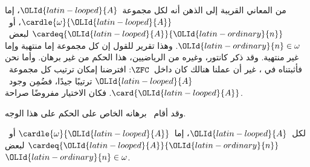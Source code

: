 \documentclass[../../../include/open-logic-section]{subfiles}
\begin{document}
\begin{ex}
من المعاني القريبة إلى الذهن أنه لكل مجموعة~$\OLId{latin-looped}{A}$، إما
$\cardle{\omega}{\OLId{latin-looped}{A}}$، أو~$\cardeq{\OLId{latin-looped}{A}}{\OLId{latin-ordinary}{n}}$ لبعض~$\OLId{latin-ordinary}{n} \in \omega$. وهذا
تقرير للقول إن كل مجموعة إما منتهية وإما غير منتهية. وقد ذكر كانتور،
وغيره من الرياضيين، هذا الحكم من غير برهان. وأما نحن فأثبتناه في
، غير أن عملنا
هنالك كان داخل~$\ZFC$: افترضنا إمكان ترتيب كل مجموعة~$\OLId{latin-looped}{A}$ ترتيبًا
جيدًا، فضُمِن وجود~$\card{\OLId{latin-looped}{A}}$. فكان الاختيار مفروضًا صراحة.

وقد أقام~\citet{Dedekind1888} برهانه الخاص على الحكم على هذا الوجه.

\begin{thm}
لكل~$\OLId{latin-looped}{A}$، إما~$\cardle{\omega}{\OLId{latin-looped}{A}}$ أو~$\cardeq{\OLId{latin-looped}{A}}{\OLId{latin-ordinary}{n}}$ لبعض
$\OLId{latin-ordinary}{n} \in \omega$.
\end{thm}


\end{ex}
\end{document}
